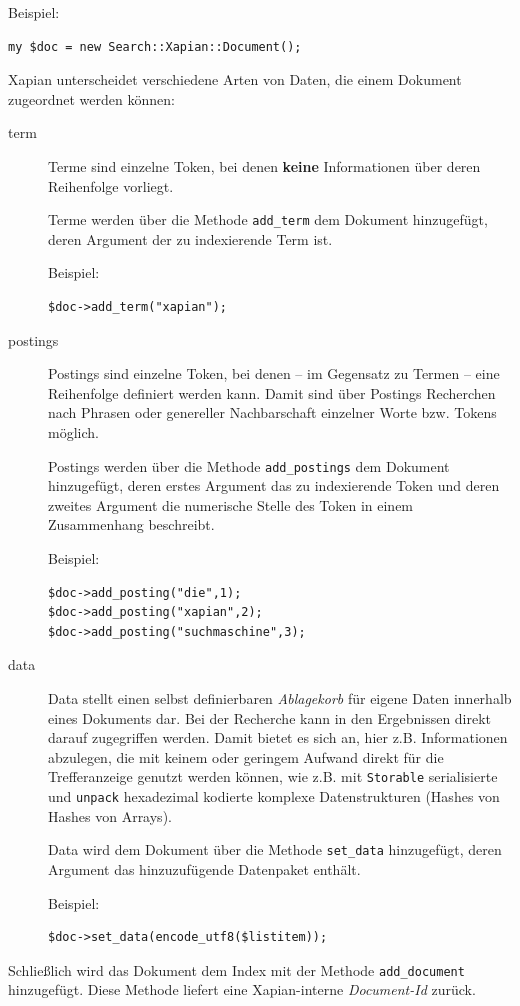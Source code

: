 \documentclass[11pt, twoside, a4paper, BCOR8mm, DIV12, bibtotoc,idxtotoc]{scrbook}
\begin{document}
Beispiel:
\begin{verbatim}
my $doc = new Search::Xapian::Document();
\end{verbatim}

Xapian unterscheidet verschiedene Arten von Daten, die einem Dokument
zugeordnet werden können:

\begin{description}
\item[term] Terme sind einzelne Token, bei denen \textbf{keine}
  Informationen über deren Reihenfolge vorliegt.

  Terme werden über die Methode \texttt{add\_term} dem Dokument
  hinzugefügt, deren Argument der zu indexierende Term ist.

  Beispiel:
\begin{verbatim}
$doc->add_term("xapian");
\end{verbatim}
\item[postings] Postings sind einzelne Token, bei denen -- im
  Gegensatz zu Termen -- eine Reihenfolge definiert werden kann. Damit
  sind über Postings Recherchen nach Phrasen oder genereller
  Nachbarschaft einzelner Worte bzw. Tokens möglich.

  Postings werden über die Methode \texttt{add\_postings} dem Dokument
  hinzugefügt, deren erstes Argument das zu indexierende Token und
  deren zweites Argument die numerische Stelle des Token in einem
  Zusammenhang beschreibt.

  Beispiel:
\begin{verbatim}
$doc->add_posting("die",1);
$doc->add_posting("xapian",2);
$doc->add_posting("suchmaschine",3);
\end{verbatim}
\item[data] Data stellt einen selbst definierbaren \emph{Ablagekorb}
  für eigene Daten innerhalb eines Dokuments dar. Bei der Recherche kann
  in den Ergebnissen direkt darauf zugegriffen werden. Damit bietet es
  sich an, hier z.B. Informationen abzulegen, die mit keinem oder
  geringem Aufwand direkt für die Trefferanzeige genutzt werden
  können, wie z.B. mit \texttt{Storable} serialisierte und
  \texttt{unpack} hexadezimal kodierte komplexe Datenstrukturen
  (Hashes von Hashes von Arrays).

  Data wird dem Dokument über die Methode \texttt{set\_data}
  hinzugefügt, deren Argument das hinzuzufügende Datenpaket enthält.

  Beispiel:
\begin{verbatim}
$doc->set_data(encode_utf8($listitem));
\end{verbatim}
\end{description}
Schließlich wird das Dokument dem Index mit der Methode
\texttt{add\_document} hinzugefügt. Diese Methode liefert eine
Xapian-interne \emph{Document-Id} zurück.
\end{document}
